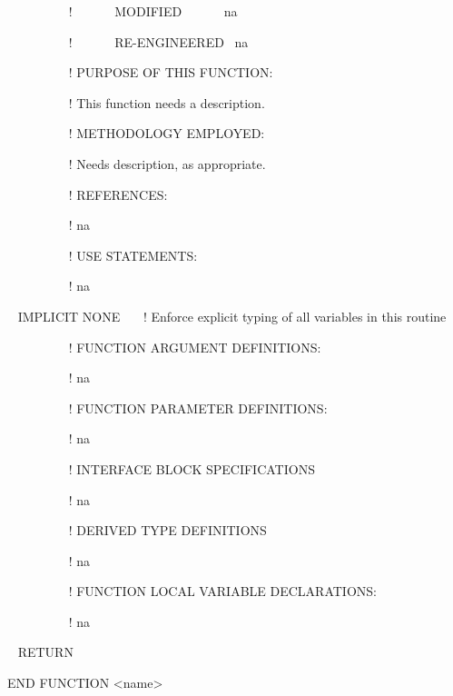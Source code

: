 ~~~~~~~~~ !~~~~~~ MODIFIED~~~~~~ na

~~~~~~~~~ !~~~~~~ RE-ENGINEERED~ na

~~~~~~~~~ ! PURPOSE OF THIS FUNCTION:

~~~~~~~~~ ! This function needs a description.

~~~~~~~~~ ! METHODOLOGY EMPLOYED:

~~~~~~~~~ ! Needs description, as appropriate.

~~~~~~~~~ ! REFERENCES:

~~~~~~~~~ ! na

~~~~~~~~~ ! USE STATEMENTS:

~~~~~~~~~ ! na

~ IMPLICIT NONE~~~ ! Enforce explicit typing of all variables in this routine

~~~~~~~~~ ! FUNCTION ARGUMENT DEFINITIONS:

~ ~~~~~~~~! na

~~~~~~~~~ ! FUNCTION PARAMETER DEFINITIONS:

~~~~~~~~~ ! na

~~~~~~~~~ ! INTERFACE BLOCK SPECIFICATIONS

~~~~~~~~~ ! na

~~~~~~~~~ ! DERIVED TYPE DEFINITIONS

~~~~~~~~~ ! na

~~~~~~~~~ ! FUNCTION LOCAL VARIABLE DECLARATIONS:

~~~~~~~~~ ! na

~ RETURN

END FUNCTION \textless{}name\textgreater{}

